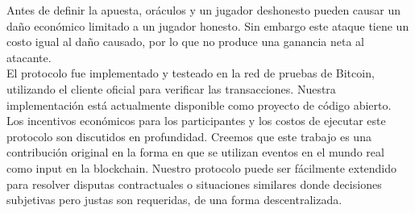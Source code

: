 Antes de definir la apuesta, or\'aculos y un jugador deshonesto pueden
  causar un da\~no econ\'omico limitado a un jugador honesto.
Sin embargo este ataque tiene un costo igual al da\~no causado, por lo que
  no produce una ganancia neta al atacante.\\
\noindent
El protocolo fue implementado y testeado en la red de pruebas de Bitcoin,
  utilizando el cliente oficial para verificar las transacciones.
Nuestra implementaci\'on est\'a actualmente disponible como proyecto de
  c\'odigo abierto.\\
\noindent
Los incentivos econ\'omicos para los participantes y los costos de
  ejecutar este protocolo son discutidos en profundidad.
Creemos que este trabajo es una contribuci\'on original en la forma en que
  se utilizan eventos en el mundo real como input en la blockchain.
Nuestro protocolo puede ser f\'acilmente extendido para resolver
  disputas contractuales o situaciones similares donde decisiones
  subjetivas pero justas son requeridas, de una forma descentralizada.
